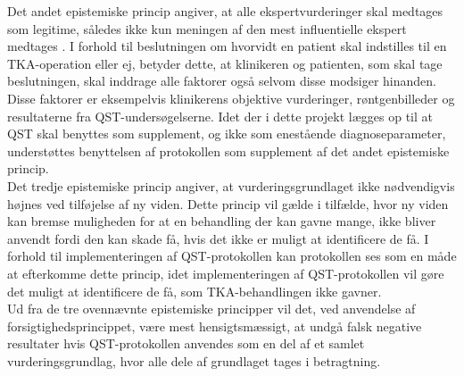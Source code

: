 Det andet epistemiske princip angiver, at alle ekspertvurderinger skal medtages som legitime, således ikke kun meningen af den mest influentielle ekspert medtages \citep{Peterson2007}. I forhold til beslutningen om hvorvidt en patient skal indstilles til en TKA-operation eller ej, betyder dette, at klinikeren og patienten, som skal tage beslutningen, skal inddrage alle faktorer også selvom disse modsiger hinanden. Disse faktorer er eksempelvis klinikerens objektive vurderinger, røntgenbilleder og resultaterne fra QST-undersøgelserne. Idet der i dette projekt lægges op til at QST skal benyttes som supplement, og ikke som enestående diagnoseparameter, understøttes benyttelsen af protokollen som supplement af det andet epistemiske princip. \\
Det tredje epistemiske princip angiver, at vurderingsgrundlaget ikke nødvendigvis højnes ved tilføjelse af ny viden. Dette princip vil gælde i tilfælde, hvor ny viden kan bremse muligheden for at en behandling der kan gavne mange, ikke bliver anvendt fordi den kan skade få, hvis det ikke er muligt at identificere de få. \citep{Peterson2007} I forhold til implementeringen af QST-protokollen kan protokollen ses som en måde at efterkomme dette princip, idet implementeringen af QST-protokollen vil gøre det muligt at identificere de få, som TKA-behandlingen ikke gavner. \\
Ud fra de tre ovennævnte epistemiske principper vil det, ved anvendelse af forsigtighedsprincippet, være mest hensigtsmæssigt, at undgå falsk negative resultater hvis QST-protokollen anvendes som en del af et samlet vurderingsgrundlag, hvor alle dele af grundlaget tages i betragtning.

